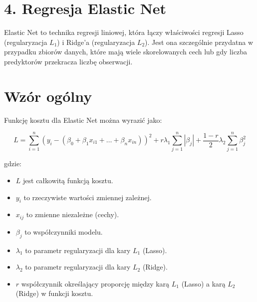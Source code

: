 {}
\justify
\fontsize{14}{16}\selectfont
\setlength{\parindent}{0pt}

\section*{4. Regresja Elastic Net \cite{alma991000280759708832}}
\fontsize{12}{14}\selectfont
\vspace{-1.0em}

\hspace{1.5cm} Elastic Net to technika regresji liniowej, która łączy właściwości regresji Lasso (regularyzacja $L_1$) i Ridge'a (regularyzacja $L_2$). Jest ona szczególnie przydatna w przypadku zbiorów danych, które mają wiele skorelowanych cech lub gdy liczba predyktorów przekracza liczbę obserwacji.

{}
\section*{Wzór ogólny}
\vspace{-1.0em}


Funkcję kosztu dla Elastic Net można wyrazić jako:
\begin{center}
    $$
L = \sum_{i=1}^{n} (y_i - (\beta_0 + \beta_1 x_{i1} + \ldots + \beta_n x_{in}))^2 + r \lambda_1 \sum_{j=1}^{n} |\beta_j| + \frac{1-r}{2}\lambda_2 \sum_{j=1}^{n} \beta_j^2
$$
\end{center}


gdzie:
\begin{itemize}
\setlength\itemsep{-0.5em}
\item $L$ jest całkowitą funkcją kosztu.
\item $y_i$ to rzeczywiste wartości zmiennej zależnej.
 \item  $x_{ij}$ to zmienne niezależne (cechy).
 \item  $\beta_j$ to współczynniki modelu.
 \item  $\lambda_1$ to parametr regularyzacji dla kary $L_1$ (Lasso).
 \item  $\lambda_2$ to parametr regularyzacji dla kary $L_2$ (Ridge).
 \item  $r$ współczynnik określający proporcję między karą $L_1$ (Lasso) a karą $L_2$ (Ridge) w funkcji kosztu.
\end{itemize}
\item 

